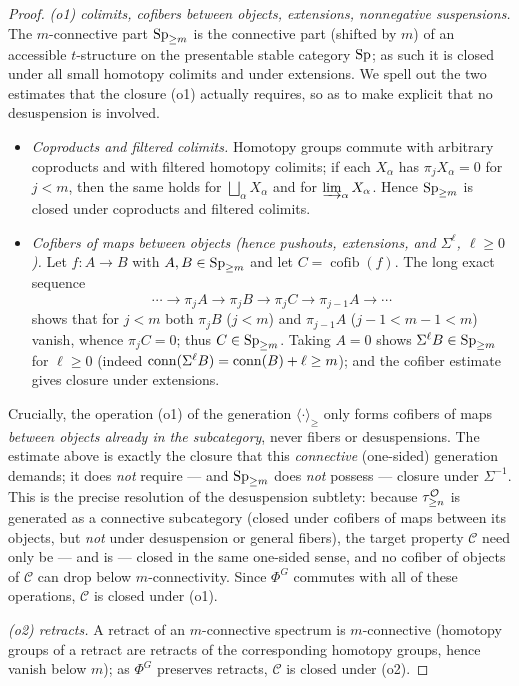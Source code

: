 \begin{proof}
\emph{(o1) colimits, cofibers between objects, extensions, nonnegative suspensions.}
The $m$-connective part $\mathrm{Sp}_{\ge m}$ is the connective part (shifted by $m$)
of an accessible $t$-structure on the presentable stable category $\mathrm{Sp}$; as
such it is closed under all small homotopy colimits and under extensions. We spell
out the two estimates that the closure (o1) actually requires, so as to make
explicit that no desuspension is involved.
\begin{itemize}\setlength\itemsep{2pt}
\item \emph{Coproducts and filtered colimits.} Homotopy groups commute with
arbitrary coproducts and with filtered homotopy colimits; if each $X_\alpha$ has
$\pi_j X_\alpha=0$ for $j<m$, then the same holds for $\bigsqcup_\alpha X_\alpha$
and for $\varinjlim_\alpha X_\alpha$. Hence $\mathrm{Sp}_{\ge m}$ is closed under
coproducts and filtered colimits.
\item \emph{Cofibers of maps between objects (hence pushouts, extensions, and
$\Sigma^{\ell}$, $\ell\ge0$).} Let $f\colon A\to B$ with $A,B\in\mathrm{Sp}_{\ge m}$
and let $C=\operatorname{cofib}(f)$. The long exact sequence
\[
\cdots\to\pi_j A\xrightarrow{\ } \pi_j B\to\pi_j C\to\pi_{j-1}A\to\cdots
\]
shows that for $j<m$ both $\pi_jB$ ($j<m$) and $\pi_{j-1}A$ ($j-1<m-1<m$) vanish,
whence $\pi_jC=0$; thus $C\in\mathrm{Sp}_{\ge m}$. Taking $A=0$ shows
$\Sigma^{\ell}B\in\mathrm{Sp}_{\ge m}$ for $\ell\ge0$ (indeed $\operatorname{conn}(\Sigma^\ell B)
=\operatorname{conn}(B)+\ell\ge m$); and the cofiber estimate gives closure under extensions.
\end{itemize}
Crucially, the operation (o1) of the generation $\langle\cdot\rangle_{\ge}$ only
forms cofibers of maps \emph{between objects already in the subcategory}, never
fibers or desuspensions. The estimate above is exactly the closure that this
\emph{connective} (one-sided) generation demands; it does \emph{not} require — and
$\mathrm{Sp}_{\ge m}$ does \emph{not} possess — closure under $\Sigma^{-1}$. This is
the precise resolution of the desuspension subtlety: because $\tau^{\mathcal{O}}_{\ge n}$
is generated as a connective subcategory (closed under cofibers of maps between
its objects, but \emph{not} under desuspension or general fibers), the target
property $\mathcal C$ need only be — and is — closed in the same one-sided sense,
and no cofiber of objects of $\mathcal C$ can drop below $m$-connectivity.
Since $\Phi^G$ commutes with all of these operations, $\mathcal C$ is closed under
(o1).

\emph{(o2) retracts.} A retract of an $m$-connective spectrum is $m$-connective
(homotopy groups of a retract are retracts of the corresponding homotopy groups,
hence vanish below $m$); as $\Phi^G$ preserves retracts, $\mathcal C$ is closed
under (o2).


\end{proof}
